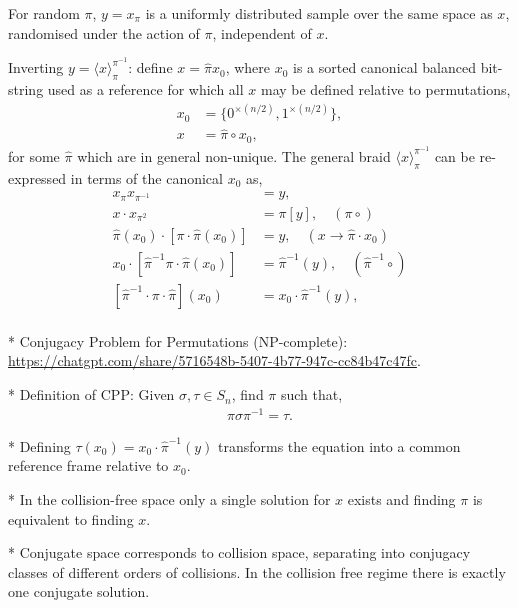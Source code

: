 \documentclass[twocolumn, aps, amsmath, amssymb, nofootinbib, superscriptaddress, longbibliography, doublefloatfix, table-of-contents, eqsecnum, rmp]{revtex4-2}
\def\selfbraid#1#2#3{\langle#1\rangle_{#2}^{#3}}
\def\symbraid#1{\langle#1\rangle_{\pi}^{\pi^{-1}}}
\begin{document}
For random $\pi$, $y=x_\pi$ is a uniformly distributed sample over the same space as $x$, randomised under the action of $\pi$, independent of $x$.

Inverting $y=\symbraid{x}$: define $x = \hat\pi x_0$, where $x_0$ is a sorted canonical balanced bit-string used as a reference for which all $x$ may be defined relative to permutations,
\begin{align}
	x_0 &= \{0^{\times(n/2)},1^{\times(n/2)}\},\nonumber\\
	x &= \hat\pi \circ x_0,
\end{align}
for some $\hat\pi$ which are in general non-unique. The general braid $\symbraid{x}$ can be re-expressed in terms of the canonical $x_0$ as,
\begin{align}
	x_\pi x_{\pi^{-1}} &= y,\nonumber\\
	x \cdot x_{\pi^2} &= \pi[y],\quad (\pi\circ)\nonumber\\
	\hat\pi(x_0) \cdot [\pi \cdot \hat\pi (x_0)] &= y,\quad (x\to \hat\pi \cdot x_0)\nonumber\\
	x_0 \cdot [\hat\pi^{-1} \pi \cdot \hat\pi (x_0)] &= \hat\pi^{-1}(y),\quad (\hat\pi^{-1}\circ)\nonumber\\
	[\hat\pi^{-1}\cdot \pi \cdot \hat\pi](x_0) &= x_0 \cdot \hat\pi^{-1}(y),\nonumber\\
\end{align}

* Conjugacy Problem for Permutations (NP-complete): \url{https://chatgpt.com/share/5716548b-5407-4b77-947c-cc84b47c47fc}.

* Definition of CPP: Given $\sigma,\tau\in S_n$, find $\pi$ such that,
\begin{align}
	\pi\sigma\pi^{-1} = \tau.	
\end{align}

* Defining $\tau(x_0) = x_0 \cdot \hat\pi^{-1}(y)$ transforms the equation into a common reference frame relative to $x_0$.

* In the collision-free space only a single solution for $x$ exists and finding $\pi$ is equivalent to finding $x$.

* Conjugate space corresponds to collision space, separating into conjugacy classes of different orders of collisions. In the collision free regime there is exactly one conjugate solution.


\end{document}
